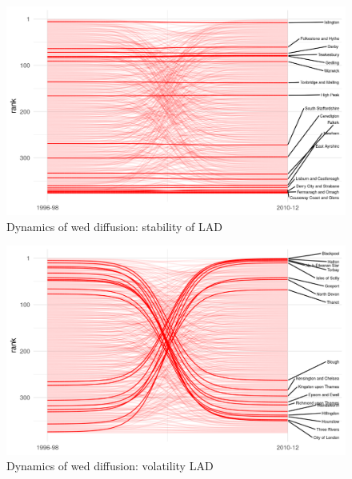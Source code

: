 \documentclass[
  authoryear,
  preprint,
  3p]{elsarticle}
\begin{document}
\begin{figure}[H]

{\centering \includegraphics[width=1\textwidth,height=\textheight]{../../outputs/ranks/web_per_firm2000_2012_only05_av.png}

}

\caption{\label{rank_stable}Dynamics of wed diffusion: stability of LAD}

\end{figure}%

\begin{figure}[H]

{\centering \includegraphics[width=1\textwidth,height=\textheight]{../../outputs/ranks/web_per_firm2000_2012_only95_av.png}

}

\caption{\label{rank_unstable}Dynamics of wed diffusion: volatility LAD}

\end{figure}%
\end{document}
